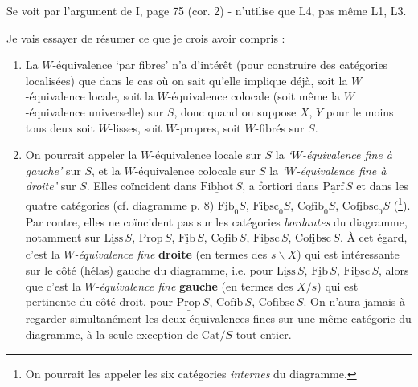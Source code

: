 \documentclass[11pt]{article}
\newcommand{\msp}[1]{\marginpar{\footnotesize [#1]}}
\newcommand{\Cat}{\mathrm{Cat}}
\newcommand{\uc}[1]{\underline{\mathrm{#1}}}
\begin{document}
Se voit par l'argument de I, page 75 (cor. 2) - n'utilise que L4, pas même L1, L3.

\msp{page 46}

Je vais essayer de résumer ce que je crois avoir compris :

\begin{enumerate}[leftmargin=*]
\item[1)] La $W$-équivalence `par fibres' n'a d'intérêt (pour construire des catégories localisées) que dans le cas où on sait qu'elle implique déjà, soit la $W$-équivalence locale, soit la $W$-équivalence colocale (soit même la $W$-équivalence universelle) sur $S$, donc quand on suppose $X$, $Y$ pour le moins tous deux soit $W$-lisses, soit $W$-propres, soit $W$-fibrés sur $S$.

\item[2)] On pourrait appeler la $W$-équivalence locale sur $S$ la \textit{`$W$-équivalence fine à gauche'} sur $S$, et la $W$-équivalence colocale sur $S$ la \textit{`$W$-équivalence fine à droite'} sur $S$. Elles coïncident dans $\uc{Fibhot}\,S$, a fortiori dans $\uc{Parf}\,S$ et dans les quatre catégories (cf. diagramme p. 8) $\uc{Fib}_0S$, $\uc{Fibsc}_0S$, $\uc{Cofib}_0S$, $\uc{Cofibsc}_0S$ (\footnote[33]{On pourrait les appeler les six catégories \textit{internes} du diagramme.}). Par contre, elles ne coïncident pas sur les catégories \textit{bordantes} du diagramme, notamment sur $\uc{Liss}\,S$, $\uc{Prop}\,S$, $\uc{Fib}\,S$, $\uc{Cofib}\,S$, $\uc{Fibsc}\,S$, $\uc{Cofibsc}\,S$. À cet égard, c'est la \textit{$W$-équivalence fine} \textbf{droite} (en termes des $s\backslash X$) qui est intéressante sur le côté (hélas) gauche du diagramme, i.e. pour $\uc{Liss}\,S$, $\uc{Fib}\,S$, $\uc{Fibsc}\,S$, alors que c'est la \textit{$W$-équivalence fine} \textbf{gauche} (en termes des $X/s$) qui est pertinente du côté droit, pour $\uc{Prop}\,S$, $\uc{Cofib}\,S$, $\uc{Cofibsc}\,S$. On n'aura jamais à regarder simultanément les deux équivalences fines sur une même catégorie du diagramme, à la seule exception de $\Cat/S$ tout entier.
\end{enumerate}

\msp{page 47}
\end{document}
